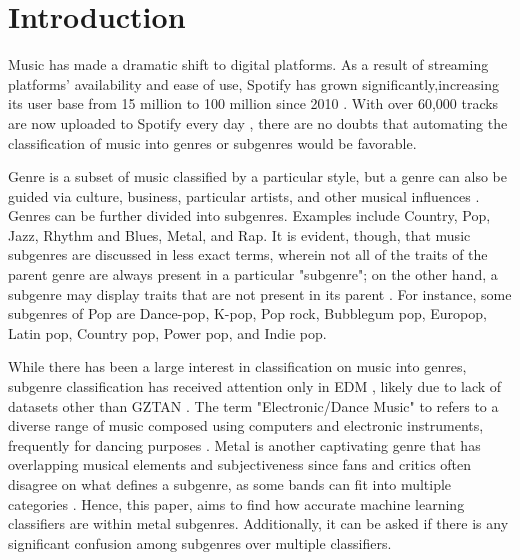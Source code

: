 \section{Introduction}
Music has made a dramatic shift to digital platforms. As a result of streaming platforms' availability and ease of use, Spotify has grown significantly,increasing its user base  from 15 million to 100 million since 2010 \cite{barata2021music}. With over 60,000 tracks are now uploaded to Spotify every day \cite{ingham2021over}, there are no doubts that automating the classification of music into genres or subgenres would be favorable.

Genre is a subset of music classified by a particular style, but a genre can also be guided via culture, business, particular artists, and other musical influences \cite{dannenberg2010style}. Genres can be further divided into subgenres. Examples include Country, Pop, Jazz, Rhythm and Blues, Metal, and Rap. It is evident, though, that music subgenres are discussed in less  exact terms, wherein not all of the traits of the parent genre are always present in a particular "subgenre"; on the other hand, a subgenre may display traits that are not present in its parent \cite{hider2023polyphony}. For instance, some subgenres of Pop are Dance-pop, K-pop, Pop rock, Bubblegum pop, Europop, Latin pop, Country pop, Power pop, and Indie pop.


While there has been a large interest in classification on music into genres, subgenre classification has received attention only in EDM \cite{doi:10.1080/09298215.2020.1761399}, likely due to lack of datasets other than GZTAN \cite{ndou2021music}. The term "Electronic/Dance Music" to refers to a diverse range of music composed using computers and electronic instruments, frequently for dancing purposes \cite{mcleod2001genres}. Metal is another captivating genre that has overlapping musical elements and subjectiveness since fans and critics often disagree on what defines a subgenre, as some bands can fit into multiple categories \cite{weinstein2000heavy}. Hence, this paper, aims to find how accurate machine learning classifiers are within metal subgenres. Additionally, it can be asked if there is any significant confusion among subgenres over multiple classifiers.